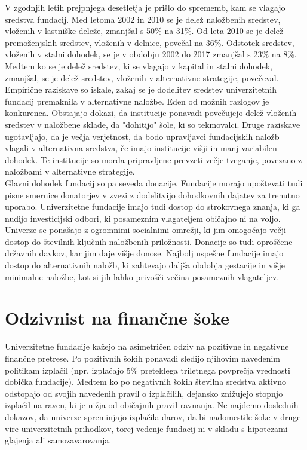 \documentclass[12pt, a4paper]{article}
\begin{document}
V zgodnjih letih prejpnjega desetletja je prišlo do sprememb, kam se vlagajo sredstva fundacij. Med letoma 2002 in 2010 se je delež naložbenih sredstev, vloženih v lastniške deleže, zmanjšal s 50\% na 31\%. Od leta 2010 se je delež premoženjskih sredstev, vloženih v delnice, povečal na 36\%. Odstotek sredstev, vloženih v stalni dohodek, se je v obdobju 2002 do 2017 zmanjšal s 23\% na 8\%. Medtem ko se je delež sredstev, ki se vlagajo v kapital in stalni dohodek, zmanjšal, se je delež sredstev, vloženih v alternativne strategije, povečeval. Empirične raziskave so iskale, zakaj se je dodelitev sredstev univerzitetnih fundacij premaknila v alternativne naložbe. Eden od možnih razlogov je konkurenca. Obstajajo dokazi, da institucije ponavadi povečujejo delež vloženih sredstev v naložbene sklade, da "dohitijo" šole, ki so tekmovalci. Druge raziskave ugotavljajo, da je večja verjetnost, da bodo upravljavci fundacijskih naložb vlagali v alternativna sredstva, če imajo institucije višji in manj variabilen dohodek. Te institucije so morda pripravljene prevzeti večje tveganje, povezano z naložbami v alternativne strategije.\cite{investment2}\\

Glavni dohodek fundacij so pa seveda donacije. Fundacije morajo upoštevati tudi pisne smernice donatorjev v zvezi z dodelitvijo dohodkovnih dajatev za trenutno uporabo. Univerzitetne fundacije imajo tudi dostop do strokovnega znanja, ki ga nudijo investicijski odbori, ki posameznim vlagateljem običajno ni na voljo. Univerze se ponašajo z ogromnimi socialnimi omrežji, ki jim omogočajo večji dostop do številnih ključnih naložbenih priložnosti.
Donacije so tudi oproščene državnih davkov, kar jim daje višje donose. Najbolj uspešne fundacije imajo dostop do alternativnih naložb, ki zahtevajo daljša obdobja gestacije in višje minimalne naložbe, kot si jih lahko privošči večina posameznih vlagateljev. \cite{Investopedia2}

\section[Odzivnost na finančne šoke]{Odzivnist na finančne šoke}

Univerzitetne fundacije kažejo na asimetričen odziv na pozitivne in negativne finančne pretrese. Po pozitivnih šokih ponavadi sledijo njihovim navedenim politikam izplačil (npr. izplačajo 5\% preteklega triletnega povprečja vrednosti dobička fundacije). Medtem ko po negativnih šokih številna sredstva aktivno odstopajo od svojih navedenih pravil o izplačilih, dejansko znižujejo stopnjo izplačil na raven, ki je nižja od običajnih pravil ravnanja. Ne najdemo doslednih dokazov, da univerze spreminjajo izplačila darov, da bi nadomestile šoke v druge vire univerzitetnih prihodkov, torej vedenje fundacij ni v skladu s hipotezami glajenja ali samozavarovanja.\\
\end{document}
